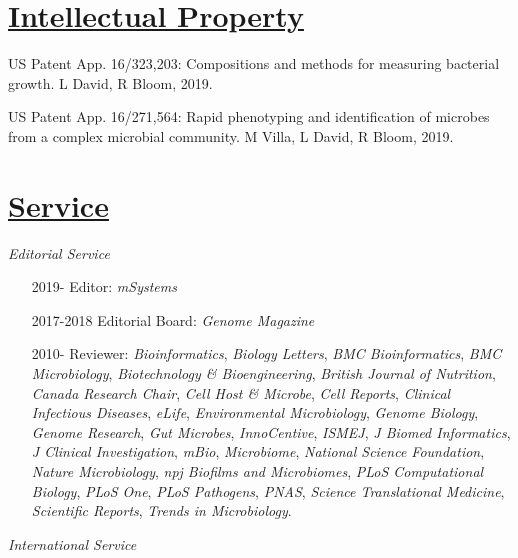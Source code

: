 \documentclass[overlapped,line,11pt]{res}
\begin{document}
\begin{resume}
\section{\underline{\sc Intellectual Property}} 
\vspace{.25in} 
\begin{revnumerate}[2]

\item {US Patent App. 16/323,203: Compositions and methods for
  measuring bacterial growth. L David, R Bloom, 2019.}
\item {US Patent App. 16/271,564: Rapid phenotyping and identification of microbes from a complex microbial community. M Villa, L David, R
  Bloom, 2019.}
\end{revnumerate}


\section{\underline{\sc Service}}
\vspace{.1in}

\emph{Editorial Service}
\vspace{.15in}

\begin{itemize}[leftmargin=2cm, style=sameline, itemsep=0mm]
\item[2019-] Editor: \emph{mSystems}
\item[2017-2018] Editorial Board: \emph{Genome Magazine}
\item[2010-] Reviewer: \emph{Bioinformatics}, \emph{Biology Letters},
  \emph{BMC Bioinformatics}, \emph{BMC Microbiology},
  \emph{Biotechnology \& Bioengineering}, \emph{British Journal of
    Nutrition}, \emph{Canada Research Chair}, \emph{Cell Host \&
    Microbe}, \emph{Cell Reports}, \emph{Clinical Infectious
    Diseases}, \emph{eLife}, \emph{Environmental Microbiology},
  \emph{Genome Biology}, \emph{Genome Research}, \emph{Gut Microbes},
  \emph{InnoCentive}, \emph{ISMEJ}, \emph{J Biomed Informatics},
  \emph{J Clinical Investigation}, \emph{mBio}, \emph{Microbiome},
  \emph{National Science Foundation}, \emph{Nature Microbiology},
  \emph{npj Biofilms and Microbiomes}, \emph{PLoS Computational
    Biology}, \emph{PLoS One}, \emph{PLoS Pathogens}, \emph{PNAS},
  \emph{Science Translational Medicine}, \emph{Scientific Reports},
  \emph{Trends in Microbiology}.
\end{itemize}

\emph{International Service}
\vspace{.15in}


\end{resume}
\end{document}
